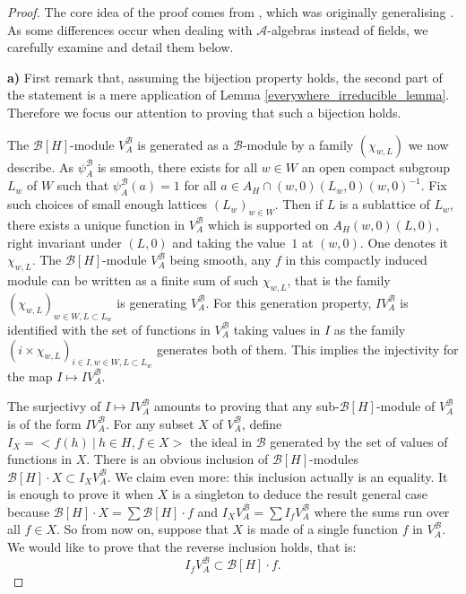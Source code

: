 \documentclass[11pt]{article}
\theoremstyle{plain}
\theoremstyle{definition}
\theoremstyle{plain}
\theoremstyle{definition}
\theoremstyle{plain}
\begin{document}
\begin{proof} The core idea of the proof comes from \cite[Lem. 2.2 b) \& Prop 2.4 c)]{trias_theta1}, which was originally generalising \cite[Chap. 2, I.3 \& I.6]{mvw}. As some differences occur when dealing with $\mathcal{A}$-algebras instead of fields, we carefully examine and detail them below.

\noindent \textbf{a)} First remark that, assuming the bijection property holds, the second part of the statement is a mere application of Lemma \ref{everywhere_irreducible_lemma}. Therefore we focus our attention to proving that such a bijection holds.

The $\mathcal{B}[H]$-module $V_A^\mathcal{B}$ is generated as a $\mathcal{B}$-module by a family $(\chi_{w,L})$ we now describe. As $\psi_A^\mathcal{B}$ is smooth, there exists for all $w \in W$ an open compact subgroup $L_w$ of $W$ such that $\psi_A^\mathcal{B}(a) = 1$ for all $a \in A_H \cap (w,0) (L_w,0)(w,0)^{-1}$. Fix such choices of small enough lattices $(L_w)_{w\in W}$. Then if $L$ is a sublattice of $L_w$, there exists a unique function in $V_A^\mathcal{B}$ which is supported on $A_H (w,0) (L,0)$, right invariant under $(L,0)$ and taking the value~$1$ at $(w,0)$. One denotes it $\chi_{w,L}$. The $\mathcal{B}[H]$-module $V_A^\mathcal{B}$ being smooth, any $f$ in this compactly induced module can be written as a finite sum of such $\chi_{w,L}$, that is the family $(\chi_{w,L})_{w \in W, L \subset L_w}$ is generating $V_A^\mathcal{B}$. For this generation property, $I V_A^\mathcal{B}$ is identified with the set of functions in $V_A^\mathcal{B}$ taking values in $I$ as the family $(i \times \chi_{w,L})_{i \in I, w \in W, L \subset L_w}$ generates both of them. This implies the injectivity for the map $I \mapsto I V_A^\mathcal{B}$.

The surjectivy of $I \mapsto I V_A^\mathcal{B}$ amounts to proving that any sub-$\mathcal{B}[H]$-module of $V_A^\mathcal{B}$ is of the form $I V_A^\mathcal{B}$. For any subset $X$ of $V_A^\mathcal{B}$, define $I_X = < f(h) \ | \ h \in H, f \in X >$ the ideal in $\mathcal{B}$ generated by the set of values of functions in $X$. There is an obvious inclusion of $\mathcal{B}[H]$-modules $\mathcal{B}[H] \cdot X \subset I_X V_A^\mathcal{B}$. We claim even more: this inclusion actually is an equality. It is enough to prove it when $X$ is a singleton to deduce the result general case because $\mathcal{B}[H] \cdot X = \sum \mathcal{B}[H] \cdot f$ and $I_X V_A^\mathcal{B} = \sum I_f V_A^\mathcal{B}$ where the sums run over all $f \in X$. So from now on, suppose that $X$ is made of a single function $f$ in $V_A^\mathcal{B}$. We would like to prove that the reverse inclusion holds, that is:
$$I_f V_A^\mathcal{B} \subset \mathcal{B}[H] \cdot f.$$


\end{proof}
\end{document}
